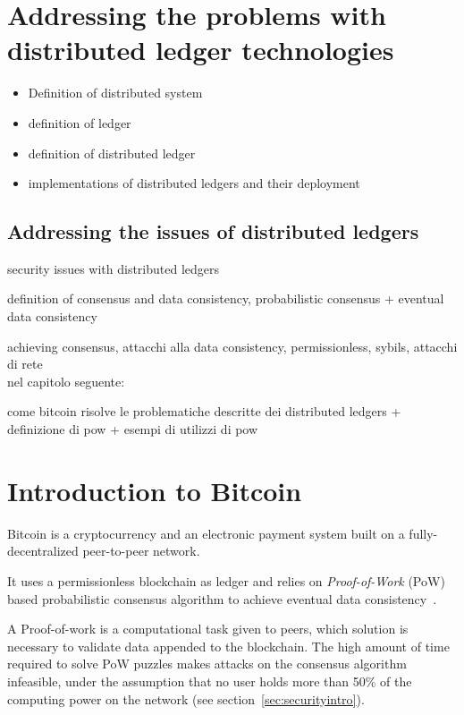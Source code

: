 \documentclass[12pt, letterpaper, twoside]{article}
\title{}
\author{}
\begin{document}
\maketitle

\section{Addressing the problems with distributed ledger technologies}\label{intro}
\begin{itemize}
	\item Definition of distributed system

	\item definition of ledger

	\item definition of distributed ledger

	\item implementations of distributed ledgers and their deployment
\end{itemize}

\subsection{Addressing the issues of distributed ledgers}\label{ledgerproblems}
security issues with distributed ledgers

definition of consensus and data consistency, probabilistic consensus + eventual data consistency

achieving consensus, attacchi alla data consistency, permissionless, sybils, attacchi di rete\\

nel capitolo seguente:

come bitcoin risolve le problematiche descritte dei distributed ledgers + definizione di pow + esempi di utilizzi di pow


\section{Introduction to Bitcoin}\label{sec:introbtc}
Bitcoin is a cryptocurrency and an electronic payment system built on a fully-decentralized peer-to-peer network.

It uses a permissionless blockchain as ledger and relies on \emph{Proof-of-Work} (PoW) based probabilistic consensus algorithm to achieve eventual data consistency~\cite{nakamoto}.

A Proof-of-work is a computational task given to peers, which solution is necessary to validate data appended to the blockchain. The high amount of time required to solve PoW puzzles makes attacks on the consensus algorithm infeasible, under the assumption that no user holds more than 50\% of the computing power on the network (see section~\ref{sec:securityintro}).
\end{document}
